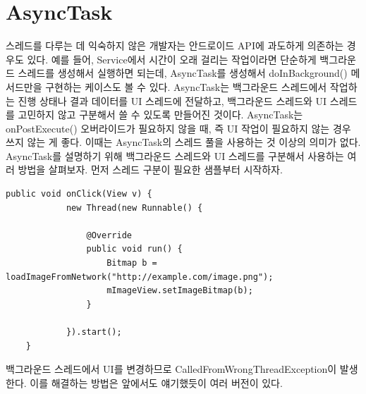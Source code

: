 \section{AsyncTask}
\label{sec:asynctask}
스레드를 다루는 데 익숙하지 않은 개발자는 안드로이드 API에 과도하게 의존하는 경우도 있다.
예를 들어, Service에서 시간이 오래 걸리는 작업이라면 단순하게 백그라운드 스레드를 생성해서 실행하면 되는데, AsyncTask를 생성해서 doInBackground() 메서드만을 구현하는 케이스도 볼 수 있다. 
AsyncTask는 백그라운드 스레드에서 작업하는 진행 상태나 결과 데이터를 UI 스레드에 전달하고, 백그라운드 스레드와 UI 스레드를 고민하지 않고 구분해서 쓸 수 있도록 만들어진 것이다.
AsyncTask는 onPostExecute() 오버라이드가 필요하지 않을 때, 즉 UI 작업이 필요하지 않는 경우 쓰지 않는 게 좋다. 
이때는 AsyncTask의 스레드 풀을 사용하는 것 이상의 의미가 없다.\\

AsyncTask를 설명하기 위해 백그라운드 스레드와 UI 스레드를 구분해서 사용하는 여러 방법을 살펴보자. 
먼저 스레드 구분이 필요한 샘플부터 시작하자.
\begin{lstlisting}[frame=single] 
	public void onClick(View v) {
    		new Thread(new Runnable() {
    		
    			@Override
        		public void run() {
            		Bitmap b = loadImageFromNetwork("http://example.com/image.png");
            		mImageView.setImageBitmap(b);
        		}
        	
    		}).start();
	}
\end{lstlisting}
백그라운드 스레드에서 UI를 변경하므로 CalledFromWrongThreadException이 발생한다.
이를 해결하는 방법은 앞에서도 얘기했듯이 여러 버전이 있다.


